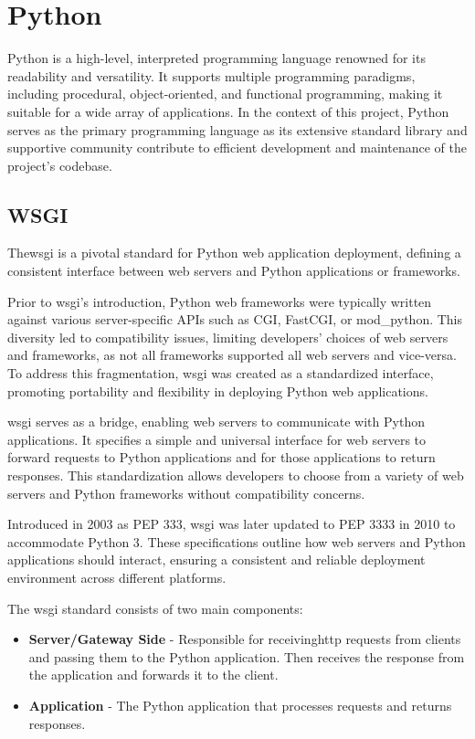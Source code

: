 \section{Python}
Python is a high-level, interpreted programming language renowned for its readability and versatility. It supports 
multiple programming paradigms, including procedural, object-oriented, and functional programming, making it suitable 
for a wide array of applications.
In the context of this project, Python serves as the primary programming language as its extensive standard library 
and supportive community contribute to efficient development and maintenance of the project's codebase.

\subsection{WSGI}
The\ac{wsgi} is a pivotal standard for Python web application deployment, defining a consistent interface between web 
servers and Python applications or frameworks.

Prior to \ac{wsgi}'s introduction, Python web frameworks were typically written against various server-specific APIs such as 
CGI, FastCGI, or mod\_python. This diversity led to compatibility issues, limiting developers' choices of web servers and 
frameworks, as not all frameworks supported all web servers and vice-versa. To address this fragmentation, \ac{wsgi} was 
created as a standardized interface, promoting portability and flexibility in deploying Python web applications. 

\ac{wsgi} serves as a bridge, enabling web servers to communicate with Python applications. It specifies a simple and universal 
interface for web servers to forward requests to Python applications and for those applications to return responses. 
This standardization allows developers to choose from a variety of web servers and Python frameworks without compatibility 
concerns\cite{pep333}.

Introduced in 2003 as PEP 333, \ac{wsgi} was later updated to PEP 3333 in 2010 to accommodate Python 3. These specifications 
outline how web servers and Python applications should interact, ensuring a consistent and reliable deployment environment 
across different platforms.

The \ac{wsgi} standard consists of two main components:
\begin{itemize}
  \item \textbf{Server/Gateway Side} - Responsible for receiving\ac{http} requests from clients and passing them to the 
  Python application. Then receives the response from the application and forwards it to the client. 
  \item \textbf{Application} - The Python application that processes requests and returns responses.
\end{itemize}

